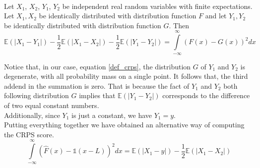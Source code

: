 \\
\begin{lemma}
    Let $X_1$, $X_2$, $Y_1$, $Y_2$ be independent real random variables with finite expectations. Let $X_1,X_2$ be identically distributed with distribution function $F$ and let $Y_1,Y_2$ be identically distributed with distribution function $G$. Then
   \begin{equation}
    \mathbb{E}(|X_1-Y_1|)-\frac{1}{2}\mathbb{E}(|X_1-X_2|)-\frac{1}{2}\mathbb{E}(|Y_1-Y_2|)=\int\limits_{-\infty}^{\infty}\left(F(x)-G(x)\right)^2dx
\end{equation}
\end{lemma}
Notice that, in our case, equation \ref{def_crps}, the distribution $G$ of $Y_1$ and $Y_2$ is degenerate, with all probability mass on a single point.
It follows that, the third addend in the summation is zero. That is because the fact of $Y_1$ and $Y_2$ both following distribution $G$ implies that $\mathbb{E}(|Y_1-Y_2|)$ corresponds to the difference of two equal constant numbers.
\\
Additionally, since $Y_1$ is just a constant, we have $Y_1=y$.
\\
Putting everything together we have obtained an alternative way of computing the CRPS score.
\begin{equation}
    \int\limits_{-\infty}^{\infty}\left(\hat{F}(x)-\mathbb{1}(x-L) \right)^2 dx=\mathbb{E}(|X_1-y|)-\frac{1}{2}\mathbb{E}(|X_1-X_2|)
\end{equation}
\\
